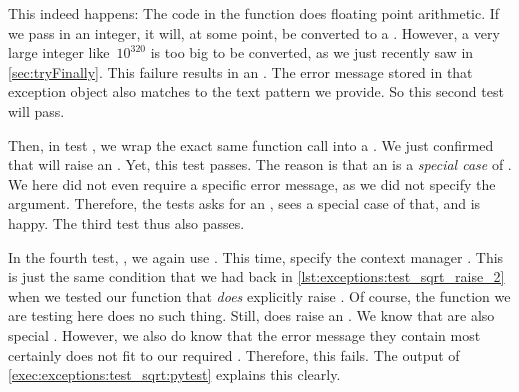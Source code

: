 This indeed happens:
The code in the function does floating point arithmetic.
If we pass in an integer, it will, at some point, be converted to a .
However, a very large integer like~$10^{320}$ is too big to be converted, as we just recently saw in \cref{sec:tryFinally}.
This failure results in an .
The error message stored in that exception object also matches to the text pattern we provide.
So this second test will pass.%
%
\begin{sloppypar}%
Then, in test , we wrap the exact same function call into a .
We just confirmed that  will raise an .
Yet, this test passes.
The reason is that an  is a \emph{special case} of .
We here did not even require a specific error message, as we did not specify the  argument.
Therefore, the tests asks for an , sees a special case of that, and is happy.
The third test thus also passes.%
\end{sloppypar}%
%
In the fourth test, , we again use .
This time, specify the context manager .
This is just the same condition that we had back in \cref{lst:exceptions:test_sqrt_raise_2} when we tested our  function that \emph{does} explicitly raise .
Of course, the  function we are testing here does no such thing.
Still,  does raise an .
We know that  are also special .
However, we also do know that the error message they contain most certainly does not fit to our required   .
Therefore, this  fails.
The output of \cref{exec:exceptions:test_sqrt:pytest} explains this clearly.

